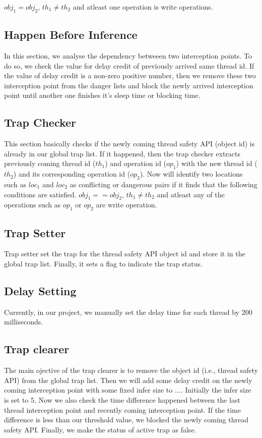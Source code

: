 $obj_1 = obj_2$, $th_1 \neq th_2$ and atleast one operation is write operations.

\subsection{Happen Before Inference} In this section, we analyse the dependency
betweeen two interception points. To do so, we check the value for delay credit
of previously arrived same thread id.   If the
value of delay credit is a non-zero positive number, then we remove these two
interception point from the danger lists and block the newly arrived
interception point until another one finishes it's sleep time or blocking time. 

\subsection{Trap Checker}
This section basically checks if the newly coming thread safety API (object id)
is already in our global trap list. If it happened, then the trap checker
extracts previously coming thread id ($th_1$) and operation id ($op_1$)  with the new thread id ($th_2$)
and its corresponding operation id ($op_2$). Now \Toolname{} will identify two locations such as $loc_1$ and $loc_2$ as conflicting or dangerous  pairs if it finds that the following conditions are satisfied. 
$obj_1 == obj_2$, $th_1 \neq th_2$ and atleast any of the operations such as $op_1$ or $op_2$ are write operation.


\subsection{Trap Setter}
Trap setter set the trap for the thread safety API object id and store it in the global trap list. Finally, it sets a flag to indicate the trap status.

\subsection{Delay Setting}
Currently, in our project, we manually set the delay time for each thread by 200 milliseconds. 

\subsection{Trap clearer}
The main ojective of the trap clearer is to remove the object id (i.e., thread safety API) from the global trap list. Then we will add some delay credit on the newly coming interception point with some fixed infer size  to .... Initially the infer size is set to 5. Now we also check the time difference happened between the last thread interception point and recently coming interception point. If the time difference is less than our threshold value, we blocked the newly coming thread safety API. Finally, we make the status of active trap as false.



